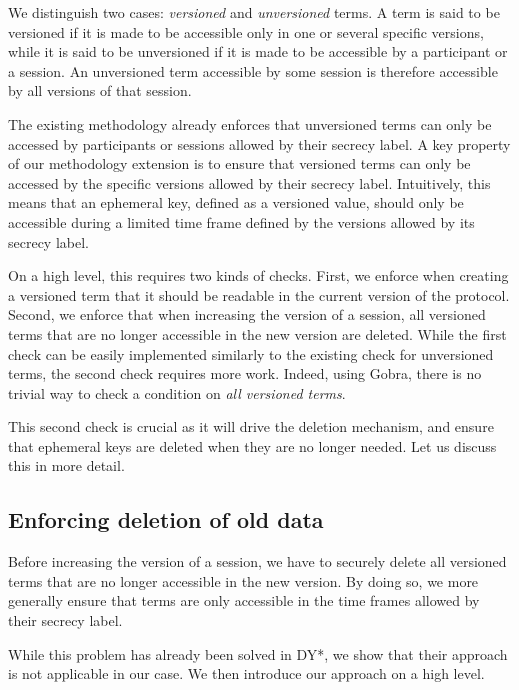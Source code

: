 We distinguish two cases: \emph{versioned} and \emph{unversioned} terms.
A term is said to be versioned if it is made to be accessible only in one or several specific versions, while it is said to be unversioned if it is made to be accessible by a participant or a session. 
An unversioned term accessible by some session is therefore accessible by all versions of that session.

The existing methodology already enforces that unversioned terms can only be accessed by participants or sessions allowed by their secrecy label.
A key property of our methodology extension is to ensure that versioned terms can only be accessed by the specific versions allowed by their secrecy label. Intuitively, this means that an ephemeral key, defined as a versioned value, should only be accessible during a limited time frame defined by the versions allowed by its secrecy label.

On a high level, this requires two kinds of checks.
First, we enforce when creating a versioned term that it should be readable in the current version of the protocol.
Second, we enforce that when increasing the version of a session, all versioned terms that are no longer accessible in the new version are deleted.
While the first check can be easily implemented similarly to the existing check for unversioned terms, the second check requires more work. Indeed, using Gobra, there is no trivial way to check a condition on \emph{all versioned terms}.

This second check is crucial as it will drive the deletion mechanism, and ensure that ephemeral keys are deleted when they are no longer needed. Let us discuss this in more detail.


\subsection{Enforcing deletion of old data}
\label{sec:enforcing-deletion-of-old-data}

Before increasing the version of a session, we have to securely delete all versioned terms that are no longer accessible in the new version. By doing so, we more generally ensure that terms are only accessible in the time frames allowed by their secrecy label.

While this problem has already been solved in DY*, we show that their approach is not applicable in our case. We then introduce our approach on a high level.

